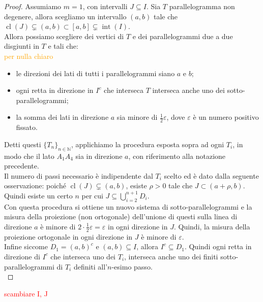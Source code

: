 \documentclass[a4paper, twoside,openright]{article}
\newcommand{\N}{\mathbb{N}}
\newcommand{\<}{\langle}
\renewcommand{\>}{\rangle}
\begin{document}
\begin{proof}
	Assumiamo $m=1$, con intervalli $J \subseteq I$. Sia $T$ parallelogramma non degenere, allora scegliamo un intervallo $(a, b)$ tale che $\operatorname{cl}(J) \subsetneq(a, b) \subset[a, b] \subsetneq \operatorname{int}(I)$.\\
	Allora possiamo scegliere dei vertici di $T$ e dei parallelogrammi due a due disgiunti in $T$ e tali che:\\
	\textcolor{orange}{per nulla chiaro}
		\begin{itemize}
		\item le direzioni dei lati di tutti i parallelogrammi siano $a$ e $b$;
		\item ogni retta in direzione in $I^c$ che interseca $T$ interseca anche uno dei sotto-parallelogrammi;
		\item la somma dei lati in direzione $a$ sia minore di $\frac{1}{2} \varepsilon$, dove $\varepsilon$ è un numero positivo fissato.
	\end{itemize}	
	Detti questi $\{T_n\}_{n \in \N}$, applichiamo la procedura esposta sopra ad ogni $T_i$, in modo che il lato $A_1A_4$ sia in direzione $a$, con riferimento alla notazione precedente.\\
	Il numero di passi necessario è indipendente dal $T_i$ scelto ed è dato dalla seguente osservazione: poiché $\operatorname{cl}(J) \subsetneq(a, b)$, esiste $\rho >0$ tale che $J \subset (a+\rho,b)$. Quindi esiste un certo $n$ per cui $J \subseteq \bigcup_{i=2}^{n+1}D_i$.\\
	Con questa procedura si ottiene un nuovo sistema di sotto-parallelogrammi e la misura della proiezione (non ortogonale) dell'unione di questi sulla linea di direzione $a$ è minore di $2 \cdot \frac{1}{2} \varepsilon=\varepsilon$ in ogni direzione in $J$. Quindi, la misura della proiezione ortogonale in ogni direzione in $J$ è minore di $\varepsilon$.\\
	Infine siccome $D_1 =(a,b)^c$ e $(a,b) \subseteq I$, allora $I^c \subseteq D_1$. Quindi ogni retta in direzione di $I^c$ che interseca uno dei $T_i$, interseca anche uno dei finiti sotto-parallelogrammi di $T_i$ definiti all'$n$-esimo passo.\\
\end{proof}
 \textcolor{red}{scambiare I, J}
\end{document}
